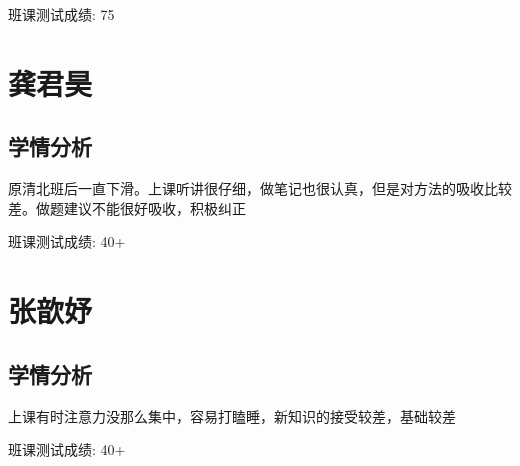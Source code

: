 \documentclass{article}
\begin{document}
班课测试成绩: 75
\vspace{2em}

\section{龚君昊}

\begin{center}
\end{center}

\subsection{学情分析}
原清北班后一直下滑。上课听讲很仔细，做笔记也很认真，但是对方法的吸收比较差。做题建议不能很好吸收，积极纠正

班课测试成绩: 40+

\vspace{2em}

\section{张歆妤}

\begin{center}
\end{center}

\subsection{学情分析}
上课有时注意力没那么集中，容易打瞌睡，新知识的接受较差，基础较差

班课测试成绩: 40+

\vspace{2em}
\end{document}
